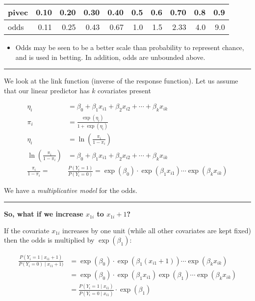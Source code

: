 \documentclass[
]{article}
\providecommand{\tightlist}{%
  \setlength{\itemsep}{0pt}\setlength{\parskip}{0pt}}
\begin{document}
\begin{table}[H]
\centering
\begin{tabular}{l|r|r|r|r|r|r|r|r|r}
\hline
pivec & 0.10 & 0.20 & 0.30 & 0.40 & 0.5 & 0.6 & 0.70 & 0.8 & 0.9\\
\hline
odds & 0.11 & 0.25 & 0.43 & 0.67 & 1.0 & 1.5 & 2.33 & 4.0 & 9.0\\
\hline
\end{tabular}
\end{table}

\begin{itemize}
\tightlist
\item
  Odds may be seen to be a better scale than probability to represent
  chance, and is used in betting. In addition, odds are unbounded above.
\end{itemize}

\begin{center}\rule{0.5\linewidth}{0.5pt}\end{center}

We look at the link function (inverse of the response function). Let us
assume that our linear predictor has \(k\) covariates present

\begin{align*}
\eta_i&= \beta_0+\beta_1 x_{i1}+\beta_2 x_{i2}+\cdots + \beta_k x_{ik}\\
\pi_i&= \frac{\exp(\eta_i)}{1+\exp(\eta_i)}\\
\eta_i&=\ln(\frac{\pi_i}{1-\pi_i})\\
\ln(\frac{\pi_i}{1-\pi_i})&=\beta_0+\beta_1 x_{i1}+\beta_2 x_{i2}+\cdots + \beta_k x_{ik}\\
\frac{\pi_i}{1-\pi_i}=&\frac{P(Y_i=1)}{P(Y_i=0)}=\exp(\beta_0)\cdot \exp(\beta_1 x_{i1})\cdots\exp(\beta_k x_{ik})
\end{align*}

We have a \emph{multiplicative model} for the odds.

\begin{center}\rule{0.5\linewidth}{0.5pt}\end{center}

\textbf{So, what if we increase \(x_{1i}\) to \(x_{1i}+1\)?}

If the covariate \(x_{1i}\) increases by one unit (while all other
covariates are kept fixed) then the odds is multiplied by
\(\exp(\beta_1)\):

\begin{align*}
\frac{P(Y_i=1\mid x_{i1}+1)}{P(Y_i=0)\mid x_{i1}+1)}&=\exp(\beta_0)\cdot \exp(\beta_1 (x_{i1}+1))\cdots\exp(\beta_k x_{ik})\\
&=\exp(\beta_0)\cdot \exp(\beta_1 x_{i1})\exp(\beta_1)\cdots\exp(\beta_k x_{ik})\\
&=\frac{P(Y_i=1\mid x_{i1})}{P(Y_i=0\mid x_{i1})}\cdot \exp(\beta_1)\\
\end{align*}
\end{document}
